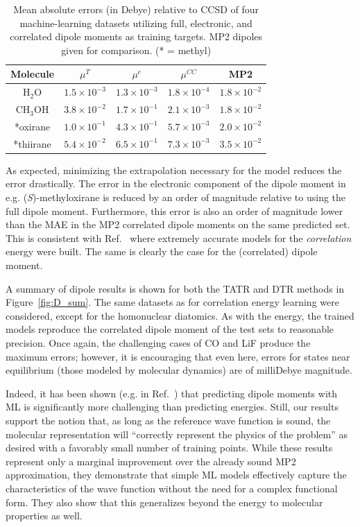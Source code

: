 \begin{table}[h]
\centering
\begin{tabular}{|c|c|c|c|c|}
    \hline
    Molecule & $\mu^{T}$ & $\mu^{e}$ & $\mu^{CC}$ & MP2 \\
    \hline
    H$_2$O & $1.5\times10^{-3}$ & $1.3\times10^{-3}$ & $1.8\times10^{-4}$ & $1.8\times10^{-2}$\\
    \hline
    CH$_3$OH & $3.8\times10^{-2}$ & $1.7\times10^{-1}$ & $2.1\times10^{-3}$ & $1.8\times10^{-2}$ \\
    \hline
    *oxirane & $1.0\times10^{-1}$ & $4.3\times10^{-1}$ & $5.7\times10^{-3}$ & $2.0\times10^{-2}$ \\
    \hline
    *thiirane & $5.4\times10^{-2}$ & $6.5\times10^{-1}$ & $7.3\times10^{-3}$ & $3.5\times10^{-2}$ \\
    \hline
\end{tabular}
\caption{Mean absolute errors (in Debye) relative to CCSD of four machine-learning datasets utilizing full, electronic, and correlated dipole moments as training targets. MP2 dipoles given for comparison. (* = methyl)} \label{table:separability}
\end{table}

As expected, minimizing the extrapolation necessary for the model reduces the error drastically. The error in the electronic component of the dipole moment in e.g. (\textit{S})-methyloxirane is reduced by an order of magnitude relative to using the full dipole moment. Furthermore, this error is also an order of magnitude lower than the MAE in the MP2 correlated dipole moments on the same predicted set. This is consistent with Ref.~ where extremely accurate models for the \textit{correlation} energy were built. The same is clearly the case for the (correlated) dipole moment.

A summary of dipole results is shown for both the TATR and DTR methods in Figure~\ref{fig:D_sum}.
The same datasets as for correlation energy learning were considered, except for the homonuclear diatomics. As with the energy, the trained models reproduce the correlated dipole moment of the test sets to reasonable precision. 
Once again, the challenging cases of CO and LiF produce the maximum errors; however, it is encouraging that even here, errors for states near equilibrium (those modeled by molecular dynamics) are of milliDebye magnitude. %

Indeed, it has been shown (e.g. in Ref.~) that predicting dipole moments with ML is significantly more challenging than predicting energies. 
Still, our results support the notion that, as long as the reference wave function is sound, the molecular representation will ``correctly represent the physics of the problem''\cite{Margraf2018} as desired with a favorably small number of training points. While these results represent only a marginal improvement over the already sound MP2 approximation, they demonstrate that simple ML models effectively capture the characteristics of the wave function without the need for a complex functional form. They also show that this generalizes beyond the energy to molecular properties as well. 

